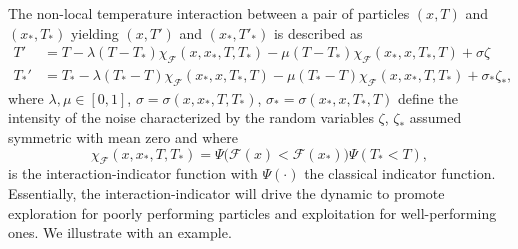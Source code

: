 \documentclass[10pt,a4paper]{article}
\theoremstyle{theorem}
\numberwithin{equation}{section}
\begin{document}
The non-local temperature interaction between a pair of particles $(x,T)$ and $(x_*,T_*)$ yielding $(x,T')$ and $(x_*,T'_*)$ is described as 
\begin{equation}
\label{eq:PT_trans}
\begin{split}
T' &= T-\lambda(T-T_*)\chi_\mathcal{F}(x,x_*,T,T_*)-\mu(T-T_*)\chi_\mathcal{F}(x_*,x,T_*,T)+\sigma\zeta\\
T_*' &= T_*-\lambda(T_*-T)\chi_\mathcal{F}(x_*,x,T_*,T)-\mu(T_*-T)\chi_\mathcal{F}(x,x_*,T,T_*)+\sigma_*\zeta_*,
\end{split}
\end{equation}
where $\lambda,\mu\in [0,1]$, $\sigma = \sigma(x,x_*,T,T_*)$, $\sigma_* = \sigma(x_*,x,T_*,T)$ define the intensity of the noise characterized by the random variables $\zeta$, $\zeta_*$ assumed symmetric with mean zero and where
\begin{equation*}
\chi_\mathcal{F}(x,x_*,T,T_*)=\Psi\big(\mathcal{F}(x)<\mathcal{F}(x_*)\big)\Psi(T_*<T),
\end{equation*}
is the interaction-indicator function with $\Psi(\cdot)$ the classical indicator function. 
Essentially, the interaction-indicator will drive the dynamic to promote exploration for poorly performing particles and exploitation for well-performing ones. We illustrate with an example.
\end{document}
